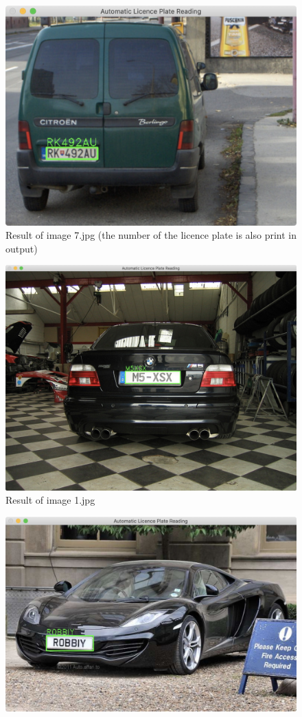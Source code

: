 \documentclass[11pt]{article}
\begin{document}
\begin{titlepage}
{\begin{figure}[htbp]
\includegraphics[totalheight=0.575\textwidth]{3.jpg}
\caption{Result of image 7.jpg (the number of the licence plate is also print in output)}
\label{}
\end{figure}
\begin{figure}[htbp]
\centering
\includegraphics[totalheight=0.7\textwidth]{1.jpg}
\caption{Result of image 1.jpg}
\label{}
\end{figure}
\begin{figure}[htbp]
\centering
\includegraphics[totalheight=0.61\textwidth]{2.jpg}

\end{figure}}
\end{titlepage}
\end{document}
